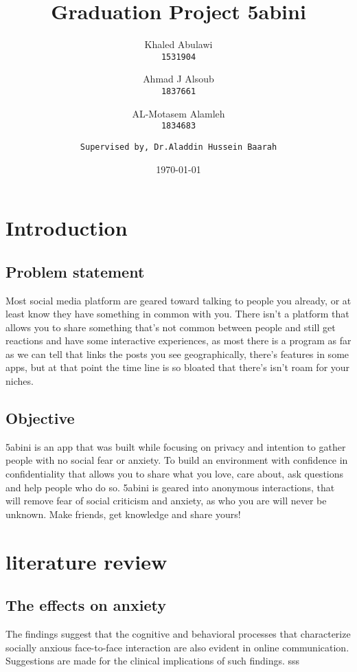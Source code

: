 \documentclass[12pt]{article}
\author{
  Khaled Abulawi\\
  \texttt{1531904}
  \and
  Ahmad J Alsoub\\
  \texttt{1837661}
  \and
  AL-Motasem Alamleh\\
  \texttt{1834683}
  \and
  \texttt{Supervised by, Dr.Aladdin Hussein Baarah}}
\date{\today}
\title{Graduation Project 5abini}
\begin{document}
\maketitle
\vspace{-20mm}
\tableofcontents










\section{Introduction}
\subsection{Problem statement}
Most social media platform are geared toward talking to people you already, or at least know they have something in common with you. There isn't a platform that allows you to share something that's not common between people and still get reactions and have some interactive experiences, as most there is a program as far as we can tell that links the posts you see geographically, there's features in some apps, but at that point the time line is so bloated that there's isn't roam for your niches.\\ 
\subsection{Objective}
5abini is an app that was built while focusing on privacy and intention to gather people with no social fear or anxiety. To  build an environment with confidence in confidentiality that allows you to share what you love, care about, ask questions and help people who do so. 5abini is geared into anonymous interactions, that will remove fear of social criticism and anxiety, as who you are will never be unknown. Make friends, get knowledge and share yours!
\sectionbreak



\sectionbreak
\section{literature review}
\subsection{The effects on anxiety}
The findings suggest that the cognitive and behavioral processes that characterize socially anxious face-to-face interaction are also evident in online communication. Suggestions are made for the clinical implications of such findings.\cite{firstone} sss
\end{document}
